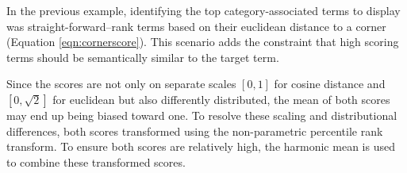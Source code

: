 \documentclass[11pt]{article}
\begin{document}
In the previous example, identifying the top category-associated terms to display was straight-forward--rank terms based on their euclidean distance to a corner (Equation \ref{eqn:cornerscore}).  This scenario adds the constraint that high scoring terms should be semantically similar to the target term. 

Since the scores are not only on separate scales $[0,1]$ for cosine distance and $[0, \sqrt{2}]$ for euclidean but also differently distributed, the mean of both scores may end up being biased toward one.  To resolve these scaling and distributional differences, both scores transformed using the non-parametric percentile rank transform.  To ensure both scores are relatively high, the harmonic mean is used to combine these transformed scores.


\nocite{ggplot2}


\end{document}
